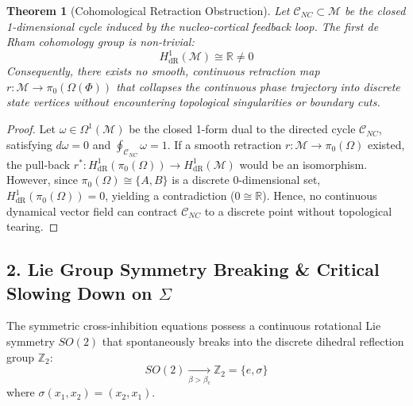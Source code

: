 \documentclass[11pt,a4paper]{article}
\newtheorem{theorem}{Theorem}
\begin{document}
\begin{theorem}[Cohomological Retraction Obstruction]
Let $\mathcal{C}_{NC} \subset \mathcal{M}$ be the closed 1-dimensional cycle induced by the nucleo-cortical feedback loop. The first de Rham cohomology group is non-trivial:
\begin{equation}
H^1_{\text{dR}}(\mathcal{M}) \cong \mathbb{R} \neq 0
\end{equation}
Consequently, there exists no smooth, continuous retraction map $r: \mathcal{M} \to \pi_0(\Omega(\Phi))$ that collapses the continuous phase trajectory into discrete state vertices without encountering topological singularities or boundary cuts.
\end{theorem}

\begin{proof}
Let $\omega \in \Omega^1(\mathcal{M})$ be the closed 1-form dual to the directed cycle $\mathcal{C}_{NC}$, satisfying $d\omega = 0$ and $\oint_{\mathcal{C}_{NC}} \omega = 1$. If a smooth retraction $r: \mathcal{M} \to \pi_0(\Omega)$ existed, the pull-back $r^*: H^1_{\text{dR}}(\pi_0(\Omega)) \to H^1_{\text{dR}}(\mathcal{M})$ would be an isomorphism. However, since $\pi_0(\Omega) \cong \{A, B\}$ is a discrete 0-dimensional set, $H^1_{\text{dR}}(\pi_0(\Omega)) = 0$, yielding a contradiction ($0 \cong \mathbb{R}$). Hence, no continuous dynamical vector field can contract $\mathcal{C}_{NC}$ to a discrete point without topological tearing.
\end{proof}

\subsection{2. Lie Group Symmetry Breaking \& Critical Slowing Down on $\Sigma$}
The symmetric cross-inhibition equations possess a continuous rotational Lie symmetry $SO(2)$ that spontaneously breaks into the discrete dihedral reflection group $\mathbb{Z}_2$:
\begin{equation}
SO(2) \xrightarrow[\beta > \beta_c]{} \mathbb{Z}_2 = \{e, \sigma\}
\end{equation}
where $\sigma(x_1, x_2) = (x_2, x_1)$.
\end{document}
